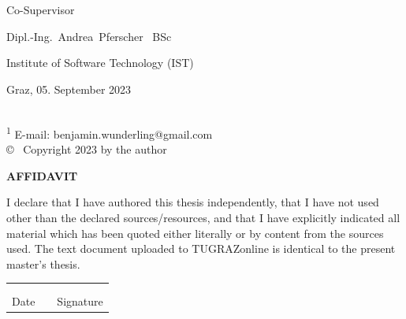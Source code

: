 \begin{titlepage}
\begin{center}
{\large Co-Supervisor}

{\large Dipl.-Ing.\ Andrea\ Pferscher \ BSc}

{\large Institute of Software Technology (IST)}
\vspace{4mm}


\vfill
{Graz, 05. September 2023}
%
%
%
%
%
%
%
%
\end{center}

\noindent
\underline{\hspace*{3cm}}\\
{\footnotesize
\textsuperscript{1} E-mail: benjamin.wunderling@gmail.com\\
\copyright ~ Copyright 2023 by the author}

\end{titlepage}
\newpage
\shipout\null
\vspace*{20mm}

\begin{center}
	{\Large\bfseries AFFIDAVIT}
\end{center}
\vspace{5mm}
\noindent
I declare that I have authored this thesis independently, that I have not used other than  the  declared  sources/resources,  and  that  I  have  explicitly  indicated  all  material which has been quoted either literally or by content from the sources used. The text document uploaded to TUGRAZonline is identical to the present master's thesis.

\vspace{2cm}

\noindent
\begin{tabular}{ccc}
	\hspace*{6cm}     & \hspace*{2cm}   & \hspace*{6.7cm}\\
	\dotfill          &                 & \dotfill\\
		   Date       &                 & Signature\\
\end{tabular}


